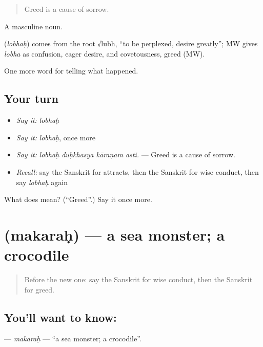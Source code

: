 \begin{quote}
Greed is a cause of sorrow.
\end{quote}

A masculine noun.

\begin{cousinweb}
\textbf{} (\emph{lobhaḥ}) comes from the root √lubh, \textquotedblleft{}to be perplexed, desire greatly\textquotedblright{}; MW gives \emph{lobha} as confusion, eager desire, and covetousness, greed (MW).
\end{cousinweb}

\begin{grammarlens}[title={What you've built}]
One more word for telling what happened.
\end{grammarlens}

\subsection*{Your turn}
\begin{itemize}
\raggedright
  \item \emph{Say it:} \emph{lobhaḥ}
  \item \emph{Say it:} \emph{lobhaḥ}, once more
  \item \emph{Say it:} \emph{lobhaḥ duḥkhasya kāraṇam asti.} — Greed is a cause of sorrow.
  \item \emph{Recall:} say the Sanskrit for attracts, then the Sanskrit for wise conduct, then say \emph{lobhaḥ} again
\end{itemize}

\begin{tcolorbox}[breakable,colback=teal!4,colframe=teal!35!black,title={Before you move on}]
What does  mean? (\textquotedblleft{}Greed\textquotedblright{}.) Say it once more.
\end{tcolorbox}
\section[\texorpdfstring{\sk{मकरः} (makaraḥ)}{मकरः (makaraḥ)}]{ (makaraḥ) — a sea monster; a crocodile}

\label{lesson:SA-C336-makarah}



\begin{quote}
Before the new one: say the Sanskrit for wise conduct, then the Sanskrit for greed.
\end{quote}

\subsection*{You'll want to know: }
\textbf{} — \emph{makaraḥ} — \textquotedblleft{}a sea monster; a crocodile\textquotedblright{}.

